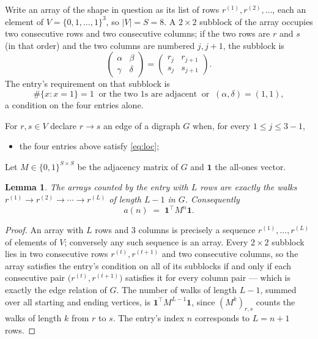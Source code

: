 \documentclass[11pt,a4paper]{article}
\theoremstyle{plain}
\newtheorem{lemma}[theorem]{Lemma}
\theoremstyle{definition}
\begin{document}
Write an array of the shape in question as its list of rows
$r^{(1)},r^{(2)},\dots$, each an element of
$V=\{0,1,\dots,1\}^{3}$, so $|V|=S=8$. A $2\times2$ subblock of the array
occupies two consecutive rows and two consecutive columns; if the two rows are $r$
and $s$ (in that order) and the two columns are numbered $j,j+1$,
the subblock is
\[
\begin{pmatrix}\alpha&\beta\\\gamma&\delta\end{pmatrix}=\begin{pmatrix}r_j&r_{j+1}\\s_j&s_{j+1}\end{pmatrix}.
\]
The entry's requirement on that subblock is
\begin{equation}\label{eq:loc}
\#\{x:x=1\}=1\ \text{ or the two }1\text{s are adjacent}\ \text{ or }\ (\alpha,\delta)=(1,1),
\end{equation}
a condition on the four entries alone.

For $r,s\in V$ declare $r\to s$ an edge of a digraph $G$ when, for every
$1\le j\le 3-1$,
\begin{itemize}
\item the four entries above satisfy \eqref{eq:loc};

\end{itemize}
Let $M\in\{0,1\}^{S\times S}$ be the adjacency matrix of $G$ and $\mathbf{1}$ the
all-ones vector.

\begin{lemma}\label{lem:walk}
The arrays counted by the entry with $L$ rows are exactly the walks
$r^{(1)}\to r^{(2)}\to\cdots\to r^{(L)}$ of length $L-1$ in $G$. Consequently
\[
a(n)\;=\;\mathbf{1}^{\!\top}M^{n}\mathbf{1} .
\]
\end{lemma}

\begin{proof}
An array with $L$ rows and $3$ columns is precisely a sequence
$r^{(1)},\dots,r^{(L)}$ of elements of $V$; conversely any such sequence is an array.
Every $2\times2$ subblock lies in two consecutive rows $r^{(t)},r^{(t+1)}$ and two
consecutive columns, so the array satisfies the entry's condition on all of its subblocks
if and only if each consecutive pair $\bigl(r^{(t)},r^{(t+1)}\bigr)$ satisfies it for
every column pair --- which is exactly the edge relation of $G$. The number of walks of
length $L-1$, summed over all starting and ending vertices, is
$\mathbf{1}^{\!\top}M^{L-1}\mathbf{1}$, since $(M^{k})_{r,s}$ counts the walks of
length $k$ from $r$ to $s$. The entry's index $n$ corresponds to $L=n+1$ rows.
\end{proof}
\end{document}
